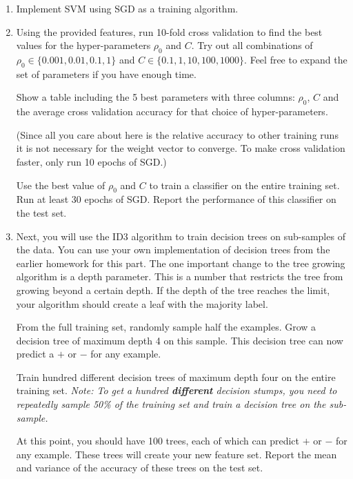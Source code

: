 \begin{enumerate}
\item Implement SVM using SGD as a training algorithm.

\item Using the provided features, run 10-fold cross validation to find
  the best values for the hyper-parameters $\rho_0$ and $C$. Try out
  all combinations of $\rho_0 \in \{0.001, 0.01, 0.1, 1\}$ and
  $C \in \{0.1, 1, 10, 100, 1000\}$. Feel free to expand the set of parameters if you have enough time.
  
  Show a table including the 5 best parameters with three columns: $\rho_0$, $C$ and the average cross
  validation accuracy for that choice of hyper-parameters. 

  (Since all you care about here is the relative accuracy to other
  training runs it is not necessary for the weight vector to converge.
  To make cross validation faster, only run 10 epochs of SGD.)

  Use the best value of $\rho_0$ and $C$ to train a classifier on the
  entire training set. Run at least 30 epochs of SGD. Report the performance of this classifier on
  the test set.

\item Next, you will use the ID3 algorithm to train decision trees on
  sub-samples of the data. You can use your own implementation of
  decision trees from the earlier homework for this part. The one
  important change to the tree growing algorithm is a depth parameter.
  This is a number that restricts the tree from growing beyond a
  certain depth. If the depth of the tree reaches the limit, your
  algorithm should create a leaf with the majority label.


  From the full training set, randomly sample half the examples. Grow
  a decision tree of maximum depth 4 on this sample. This decision
  tree can now predict a $+$ or $-$ for any example. 

  Train hundred different decision trees of maximum depth four on the
  entire training set. {\em Note: To get a hundred {\bf different}
    decision stumps, you need to repeatedly sample 50\% of the
    training set and train a decision tree on the sub-sample.}
  
  At this point, you should have 100 trees, each of which can predict
  $+$ or $-$ for any example. These trees will create your new feature
  set. Report the mean and variance of the accuracy of these trees on the test set.


\end{enumerate}

